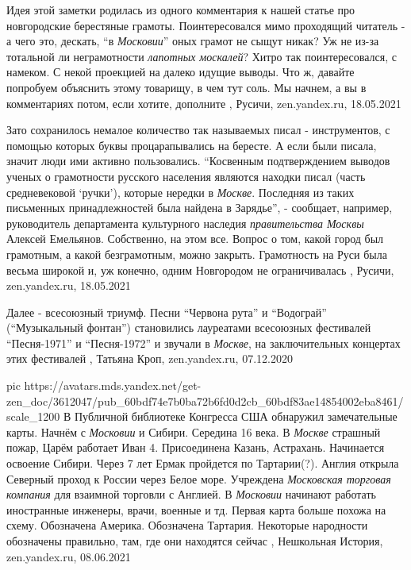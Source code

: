 Идея этой заметки родилась из одного комментария к нашей статье про
новгородские берестяные грамоты. Поинтересовался мимо проходящий читатель - а
чего это, дескать, \enquote{в \emph{Московии}} оных грамот не сыщут никак? Уж не из-за
тотальной ли неграмотности \emph{лапотных москалей}? Хитро так поинтересовался, с
намеком. С некой проекцией на далеко идущие выводы.  Что ж, давайте попробуем
объяснить этому товарищу, в чем тут соль. Мы начнем, а вы в комментариях потом,
если хотите, дополните
, 
Русичи, zen.yandex.ru, 18.05.2021

Зато сохранилось немалое количество так называемых писал - инструментов, с
помощью которых буквы процарапывались на бересте. А если были писала, значит
люди ими активно пользовались. \enquote{Косвенным подтверждением выводов ученых о
грамотности русского населения являются находки писал (часть средневековой
\enquote{ручки}), которые нередки в \emph{Москве}. Последняя из таких письменных
принадлежностей была найдена в Зарядье}, - сообщает, например, руководитель
департамента культурного наследия \emph{правительства Москвы} Алексей Емельянов.
Собственно, на этом все. Вопрос о том, какой город был грамотным, а какой
безграмотным, можно закрыть. Грамотность на Руси была весьма широкой и, уж
конечно, одним Новгородом не ограничивалась
, 
Русичи, zen.yandex.ru, 18.05.2021

Далее - всесоюзный триумф. Песни \enquote{Червона рута} и \enquote{Водограй} (\enquote{Музыкальный
фонтан}) становились лауреатами всесоюзных фестивалей \enquote{Песня-1971} и
\enquote{Песня-1972} и звучали в \emph{Москве}, на заключительных концертах этих фестивалей
, 
Татьяна Кроп, zen.yandex.ru, 07.12.2020

\ifcmt
  pic https://avatars.mds.yandex.net/get-zen_doc/3612047/pub_60bdf74e7b0ba72b6fd0d2cb_60bdf83ae14854002eba8461/scale_1200
\fi
В Публичной библиотеке Конгресса США обнаружил замечательные карты.  Начнём с
\emph{Московии} и Сибири.  Середина 16 века. В \emph{Москве} страшный пожар,
Царём работает Иван 4. Присоединена Казань, Астрахань. Начинается освоение
Сибири.  Через 7 лет Ермак пройдется по Тартарии(?).  Англия открыла Северный
проход к России через Белое море. Учреждена \emph{Московская торговая компания}
для взаимной торговли с Англией.  В \emph{Московии} начинают работать
иностранные инженеры, врачи, военные и тд.  Первая карта больше похожа на
схему. Обозначена Америка. Обозначена Тартария. Некоторые народности обозначены
правильно, там, где они находятся сейчас
, 
Нешкольная История, zen.yandex.ru, 08.06.2021

